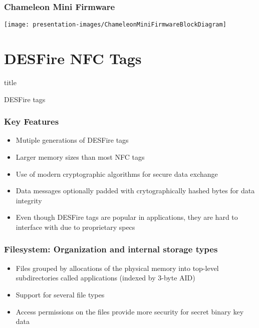 \documentclass[usenames,svgnames,dvipsnames,11pt]{beamer}
\newcommand{\TitleBoxed}[1]{
     \begin{beamercolorbox}[sep=8pt,center,shadow=true,rounded=true]{title}
          \usebeamerfont{title}#1\par%
     \end{beamercolorbox}
}
\begin{document}
\begin{frame}
\frametitle{Chameleon Mini Firmware}

\begin{center}
\texttt{[image: presentation-images/ChameleonMiniFirmwareBlockDiagram]}
\end{center}

\end{frame}

\section{DESFire NFC Tags} 

\begin{frame}
\TitleBoxed{
     \Huge{\centerline{DESFire tags}}
}
\end{frame}

\begin{frame}
\frametitle{Key Features}

\begin{itemize}
\item Mutiple generations of DESFire tags 
\item Larger memory sizes than most NFC tags 
\item Use of modern cryptographic algorithms for 
      secure data exchange
\item Data messages optionally padded with crytographically hashed bytes for data integrity 
\item Even though DESFire tags are popular in applications, 
      they are hard to interface with due to proprietary specs 
\end{itemize}

\end{frame}

\begin{frame}
\frametitle{Filesystem: Organization and internal storage types}

\begin{itemize}
\item Files grouped by allocations of the physical memory into 
      top-level subdirectories called applications (indexed by 3-byte AID) 
\item Support for several file types
\item Access permissions on the files provide more security for secret binary key data 
\end{itemize}

\end{frame}
\end{document}
